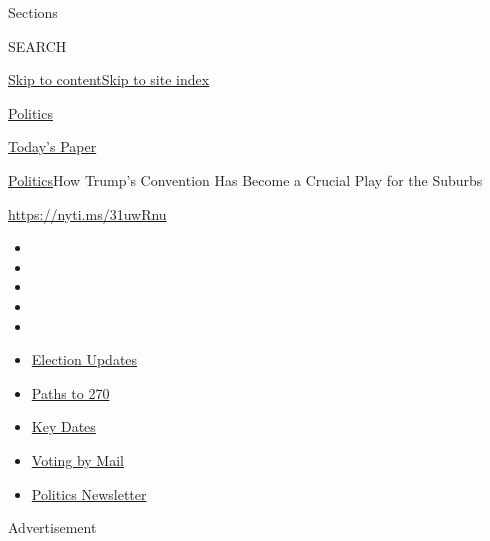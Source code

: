 Sections

SEARCH

\protect\hyperlink{site-content}{Skip to
content}\protect\hyperlink{site-index}{Skip to site index}

\href{https://www.nytimes3xbfgragh.onion/section/politics}{Politics}

\href{https://myaccount.nytimes3xbfgragh.onion/auth/login?response_type=cookie\&client_id=vi}{}

\href{https://www.nytimes3xbfgragh.onion/section/todayspaper}{Today's
Paper}

\href{/section/politics}{Politics}\textbar{}How Trump's Convention Has
Become a Crucial Play for the Suburbs

\url{https://nyti.ms/31uwRnu}

\begin{itemize}
\item
\item
\item
\item
\item
\end{itemize}

\begin{itemize}
\item
  \href{https://www.nytimes3xbfgragh.onion/live/2020/09/11/us/trump-vs-biden?action=click\&pgtype=Article\&state=default\&region=TOP_BANNER\&context=storylines_menu}{Election
  Updates}
\item
  \href{https://www.nytimes3xbfgragh.onion/interactive/2020/us/elections/election-states-biden-trump.html?action=click\&pgtype=Article\&state=default\&region=TOP_BANNER\&context=storylines_menu}{Paths
  to 270}
\item
  \href{https://www.nytimes3xbfgragh.onion/interactive/2019/us/elections/2020-presidential-election-calendar.html?action=click\&pgtype=Article\&state=default\&region=TOP_BANNER\&context=storylines_menu}{Key
  Dates}
\item
  \href{https://www.nytimes3xbfgragh.onion/interactive/2020/08/31/us/politics/vote-by-mail-deadlines.html?action=click\&pgtype=Article\&state=default\&region=TOP_BANNER\&context=storylines_menu}{Voting
  by Mail}
\item
  \href{https://www.nytimes3xbfgragh.onion/newsletters/politics?action=click\&pgtype=Article\&state=default\&region=TOP_BANNER\&context=storylines_menu}{Politics
  Newsletter}
\end{itemize}

Advertisement

